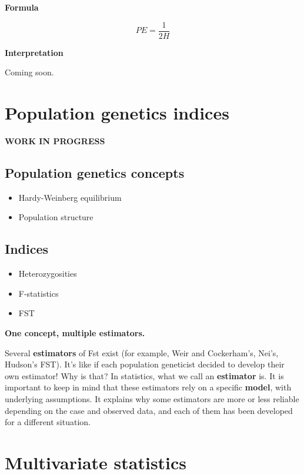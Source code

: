 \documentclass[
  a5paper]{book}
\begin{document}
\textbf{Formula}

\[
PE = \frac{1}{2H}
\]

\textbf{Interpretation}

Coming soon.

\hypertarget{population-genetics-indices}{%
\chapter{Population genetics indices}\label{population-genetics-indices}}

\textbf{WORK IN PROGRESS}

\hypertarget{population-genetics-concepts}{%
\section{Population genetics concepts}\label{population-genetics-concepts}}

\begin{itemize}
\item
  Hardy-Weinberg equilibrium
\item
  Population structure
\end{itemize}

\hypertarget{indices}{%
\section{Indices}\label{indices}}

\begin{itemize}
\item
  Heterozygosities
\item
  F-statistics
\item
  FST
\end{itemize}

\textbf{One concept, multiple estimators.}

Several \textbf{estimators} of Fst exist (for example, Weir and Cockerham's, Nei's,
Hudson's FST). It's like if each population geneticist decided to develop their
own estimator! Why is that? In statistics, what we call an \textbf{estimator}
is. It is important to keep in mind that these estimators rely on a specific \textbf{model},
with underlying assumptions. It explains why some estimators are more or less reliable
depending on the case and observed data, and each of them has been developed for
a different situation.

\hypertarget{multivariate-statistics}{%
\chapter{Multivariate statistics}\label{multivariate-statistics}}
\end{document}
